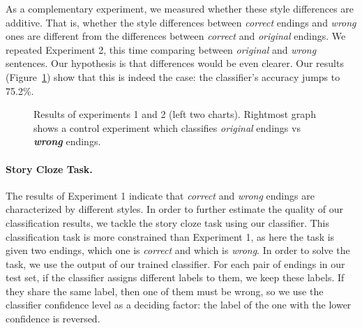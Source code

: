 \documentclass[11pt,a4paper]{article}
\newcommand{\figref}[1]{Figure~\ref{#1}}
\begin{document}
As a complementary experiment, we measured whether these style differences are additive. 
That is, whether the style differences between {\it correct} endings and {\it wrong} ones are different from the differences between {\it correct} and {\it original} endings.
We repeated Experiment 2, this time comparing between {\it original} and {\it wrong} sentences. 
Our hypothesis is that differences would be even clearer. 
Our results (\figref{results}) show that this is indeed the case: the classifier's accuracy jumps to 75.2\%.

\begin{figure}
\caption{\label{results} Results of  experiments 1 and 2 (left two charts). 
Rightmost graph shows a control experiment which classifies {\it original} endings vs \textit{\textbf{wrong}} endings. }
\end{figure}


\paragraph{Story Cloze Task.}
The results of Experiment 1 indicate that {\it correct} and {\it wrong} endings are characterized by different styles.
In order to further estimate the quality of our classification results, we tackle the story cloze task using our classifier.
This classification task is more constrained than Experiment 1, as here the task is given two endings, which one is {\it correct} and which is {\it wrong}.
In order to solve the task, we use the output of our trained classifier. 
For each pair of endings in our test set, if the classifier assigns different labels to them, we keep these labels. 
If they share the same label, then one of them must be wrong, so we use the classifier confidence level as a deciding factor: the label of the one with the lower confidence is reversed. 
\end{document}
